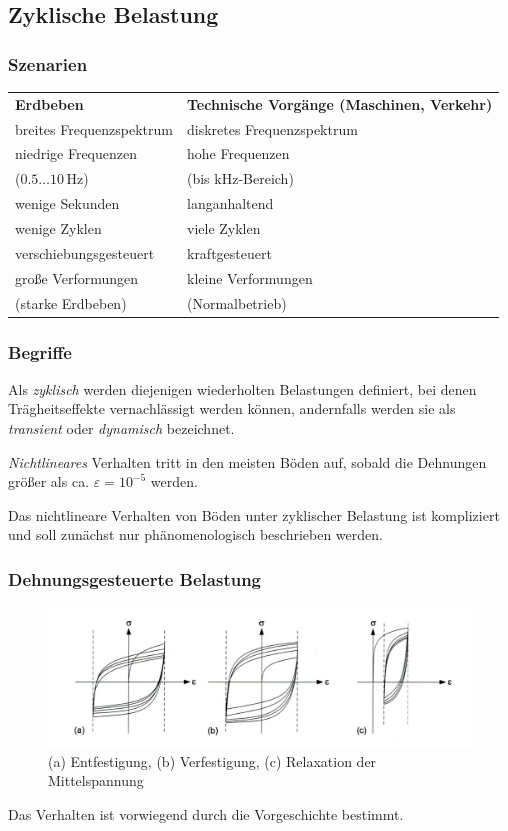 \documentclass[hyperref={pdfpagemode=FullScreen, colorlinks=false}]{beamer}
\begin{document}
\subsection{Zyklische Belastung}

\begin{frame}
\frametitle{Szenarien}

\begin{tabular}{ll} 
\textbf{Erdbeben} & \textbf{Technische Vorgänge (Maschinen, Verkehr)} \\[2mm] 
breites Frequenzspektrum  & diskretes Frequenzspektrum  \\[1mm] 
niedrige Frequenzen& hohe Frequenzen\\
($0.5 \dots 10$\,Hz)  & (bis kHz-Bereich) \\[1mm] 
wenige Sekunden  & langanhaltend \\[1mm] 
wenige Zyklen & viele Zyklen \\[1mm] 
verschiebungsgesteuert & kraftgesteuert \\[1mm] 
große Verformungen& kleine Verformungen\\
(starke Erdbeben) & (Normalbetrieb) 
\end{tabular}

\end{frame}

\begin{frame}
\frametitle{Begriffe}
Als \textsl{zyklisch} werden diejenigen wiederholten Belastungen definiert, 
bei denen Trägheitseffekte vernachlässigt werden können, andernfalls werden sie als
\textsl{transient} oder \textsl{dynamisch} bezeichnet.

\bigskip

\textsl{Nichtlineares} Verhalten tritt in den meisten Böden auf, 
sobald die Dehnungen größer als ca. $\varepsilon=10^{-5}$ werden. 

\bigskip

Das nichtlineare Verhalten von Böden unter zyklischer Belastung ist kompliziert 
und soll zunächst nur phänomenologisch beschrieben werden.
\end{frame}

\begin{frame}
\frametitle{Dehnungsgesteuerte Belastung}
\begin{figure}
\includegraphics[width=\linewidth]{fig_img/bild14abc.jpg}
\caption*{(a) Entfestigung, (b) Verfestigung, (c) Relaxation der Mittelspannung \cite{Vrettos2017}} 
\end{figure}
Das Verhalten ist vorwiegend durch die Vorgeschichte bestimmt.
\end{frame}
\end{document}
